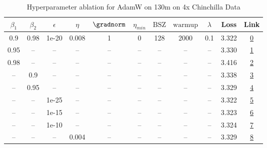 \begin{table}[H]
\centering
\caption{Hyperparameter ablation for AdamW on 130m on 4x Chinchilla Data}
\label{tab:ablation_adamw_130m_on_4x_chinchilla_data}
\begin{tabular}{ccccccccccc}
\toprule
$\beta_1$ & $\beta_2$ & $\epsilon$ & $\eta$ & $\gradnorm$ & $\eta_{min}$ & $\mathrm{BSZ}$ & $\mathrm{warmup}$ & $\lambda$ & Loss & Link \\
\midrule
0.9 & 0.98 & 1e-20 & 0.008 & 1 & 0 & 128 & 2000 & 0.1 & 3.322 & \href{https://wandb.ai/stanford-mercury/optimizer-scaling/runs/sweep-130m-10B-adamw28a1ddlr0.008-wd0.1-minlr0-warmup2000-b10.9--a5a31c}{0} \\
\midrule
0.95 & -- & -- & -- & -- & -- & -- & -- & -- & 3.330 & \href{https://wandb.ai/stanford-mercury/optimizer-scaling/runs/sweep-130m-10B-adamw3cefb4lr0.008-wd0.1-minlr0-warmup2000-b10.95-d2de07}{1} \\
0.98 & -- & -- & -- & -- & -- & -- & -- & -- & 3.416 & \href{https://wandb.ai/stanford-mercury/optimizer-scaling/runs/sweep-130m-10B-adamwdec095lr0.008-wd0.1-minlr0-warmup2000-b10.98-5164f7}{2} \\
-- & 0.9 & -- & -- & -- & -- & -- & -- & -- & 3.338 & \href{https://wandb.ai/stanford-mercury/optimizer-scaling/runs/sweep-130m-10B-adamw50c768lr0.008-wd0.1-minlr0-warmup2000-b10.9--374622}{3} \\
-- & 0.95 & -- & -- & -- & -- & -- & -- & -- & 3.329 & \href{https://wandb.ai/stanford-mercury/optimizer-scaling/runs/sweep-130m-10B-adamw41da7flr0.008-wd0.1-minlr0-warmup2000-b10.9--e79638}{4} \\
-- & -- & 1e-25 & -- & -- & -- & -- & -- & -- & 3.322 & \href{https://wandb.ai/stanford-mercury/optimizer-scaling/runs/sweep-130m-10B-adamw11bb27lr0.008-wd0.1-minlr0-warmup2000-b10.9--112190}{5} \\
-- & -- & 1e-15 & -- & -- & -- & -- & -- & -- & 3.323 & \href{https://wandb.ai/stanford-mercury/optimizer-scaling/runs/sweep-130m-10B-adamw2151b5lr0.008-wd0.1-minlr0-warmup2000-b10.9--8b96e9}{6} \\
-- & -- & 1e-10 & -- & -- & -- & -- & -- & -- & 3.324 & \href{https://wandb.ai/stanford-mercury/optimizer-scaling/runs/sweep-130m-10B-adamwc59aaalr0.008-wd0.1-minlr0-warmup2000-b10.9--64f3e7}{7} \\
-- & -- & -- & 0.004 & -- & -- & -- & -- & -- & 3.329 & \href{https://wandb.ai/stanford-mercury/optimizer-scaling/runs/sweep-130m-10B-adamw05a8e1lr0.004-wd0.1-minlr0-warmup2000-b10.9--765ae0}{8} \\

\end{tabular}
\end{table}
